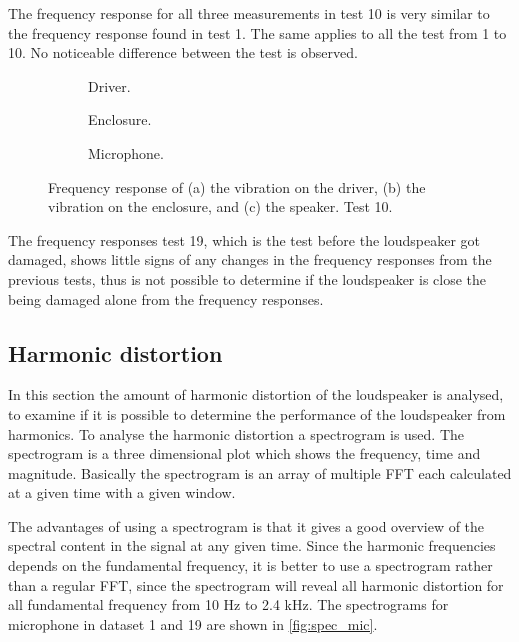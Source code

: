 The frequency response for all three measurements in test 10 is very similar to the frequency response found in test 1. The same applies to all the test from 1 to 10. No noticeable difference between the test is observed.

\begin{figure}[H]
\centering
\begin{subfigure}[t]{0.37\textwidth}
	
	\caption{Driver.}
	\label{fig:FFT_driver19}
\end{subfigure}
\begin{subfigure}[t]{0.28\textwidth}
	
	\caption{Enclosure.}
	\label{fig:FFT_enclosure19}
\end{subfigure}
\begin{subfigure}[t]{0.32\textwidth}
	
	\caption{Microphone.}
	\label{fig:FFT_mic19}
\end{subfigure}
\caption{Frequency response of (a) the vibration on the driver, (b) the vibration on the enclosure, and (c) the speaker. Test 10.}
\label{fig:FFT19}
\end{figure} 

The frequency responses test 19, which is the test before the loudspeaker got damaged, shows little signs of any changes in the frequency responses from the previous tests, thus is not possible to determine if the loudspeaker is close the being damaged alone from the frequency responses.


\subsection{Harmonic distortion}

In this section the amount of harmonic distortion of the loudspeaker is analysed, to examine if it is possible to determine the performance of the loudspeaker from harmonics. To analyse the harmonic distortion a spectrogram is used. The spectrogram is a three dimensional plot which shows the frequency, time and magnitude. Basically the spectrogram is an array of multiple FFT each calculated at a given time with a given window.

The advantages of using a spectrogram is that it gives a good overview of the spectral content in the signal at any given time. Since the harmonic frequencies depends on the fundamental frequency, it is better to use a spectrogram rather than a regular FFT, since the spectrogram will reveal all harmonic distortion for all fundamental frequency from 10 Hz to 2.4 kHz. The spectrograms for microphone in dataset 1 and 19 are shown in \autoref{fig:spec_mic}.

